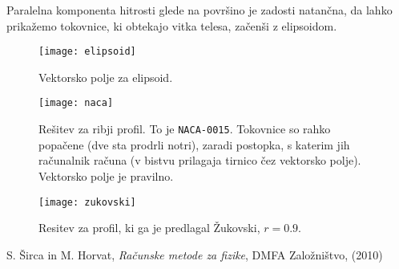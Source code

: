 \documentclass[a4 paper, 12pt]{article}
\begin{document}
Paralelna komponenta hitrosti glede na povr\v sino je zadosti natan\v cna, da lahko prika\v zemo tokovnice, ki obtekajo
vitka telesa, za\v cen\v si z elipsoidom. 

\begin{figure}[H]\centering
	\texttt{[image: elipsoid]}
	\caption{Vektorsko polje za elipsoid.}
	\label{gr3}
\end{figure}

\begin{figure}[H]\centering
	\texttt{[image: naca]}
	\caption{Re\v sitev za ribji profil. To je {\tt NACA-0015}. Tokovnice so rahko popa\v cene
		(dve sta prodrli notri), zaradi postopka, s katerim jih ra\v cunalnik ra\v cuna (v bistvu
		prilagaja tirnico \v cez vektorsko polje). Vektorsko polje je pravilno.}
	\label{gr4}
\end{figure}

\begin{figure}[H]\centering
	\texttt{[image: zukovski]}
	\caption{Resitev za profil, ki ga je predlagal \v Zukovski, $r = 0.9$.}
	\label{gr5}
\end{figure}

\begin{thebibliography}{9}
		S. \v Sirca in M. Horvat,
		{\em Ra\v cunske metode za fizike},
		DMFA Zalo\v zni\v stvo,
		(2010)
\end{thebibliography}
\end{document}
